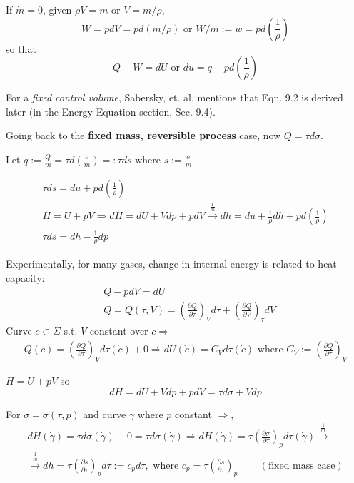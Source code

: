 \documentclass[twoside,landscape,10pt]{amsart}
\theoremstyle{plain}
\theoremstyle{definition}
\theoremstyle{remark}
\theoremstyle{remark}
\begin{document}
\begin{multicols*}{2}
If $\dot{m} = 0$, given $\rho V = m$ or $V = m / \rho$, 
\[
W = pdV = pd(m/\rho ) \text{ or } W / m := w = p d\left( \frac{1}{\rho } \right) 
\]
so that 
\[
Q -W = dU \text{ or } du = q - p d \left(\frac{1}{\rho} \right) 
\]

For a \emph{fixed control volume}, Sabersky, et. al. \cite{SAHG1998} mentions that Eqn. 9.2 is derived later (in the Energy Equation section, Sec. 9.4). 

Going back to the \textbf{fixed mass, reversible process} case, now $Q = \tau d\sigma$. 

Let $q := \frac{Q}{m} = \tau d\left( \frac{\sigma}{m} \right) =: \tau ds$ where $s := \frac{\sigma}{m}$

\begin{equation}
\begin{gathered}
\tau ds = du + p d\left( \frac{1}{\rho} \right) \\
H = U + pV \Longrightarrow dH = dU + Vdp + pdV \xrightarrow{\frac{1}{m}} dh = du + \frac{1}{\rho} dh + pd\left( \frac{1}{\rho} \right) \\
\tau ds = dh - \frac{1}{\rho} dp
\end{gathered}
\end{equation}

Experimentally, for many gases, change in internal energy is related to heat capacity:
\[
\begin{aligned} 
& Q - pdV = dU \\ 
& Q = Q(\tau, V) =  \left( \frac{ \partial Q}{ \partial \tau} \right)_V d\tau + \left( \frac{ \partial Q}{ \partial V} \right)_{\tau} dV 
\end{aligned} 
\]
Curve $c \subset \Sigma$ s.t. $V$ constant over $c \Longrightarrow$ 
\[
\begin{gathered}
Q(\dot{c}) =  \left( \frac{ \partial Q}{ \partial \tau } \right)_V d\tau (\dot{c}) + 0 \Longrightarrow dU(\dot{c}) = C_V d\tau (\dot{c}) \text{ where } C_V := \left( \frac{ \partial Q}{ \partial \tau} \right)_V
\end{gathered}
\]

$H = U + pV$ so 
\[
dH = dU + Vdp + pdV = \tau d\sigma +Vdp
\]

For $\sigma = \sigma(\tau, p)$ and curve $\gamma$ where $p$ constant $\Longrightarrow $,
\[
\begin{gathered}
	dH(\dot{\gamma}) = \tau d\sigma(\dot{\gamma}) + 0 = \tau d\sigma(\dot{\gamma}) \Longrightarrow dH(\dot{\gamma}) = \tau \left( \frac{ \partial \sigma}{ \partial \tau} \right)_p d\tau(\dot{\gamma} ) \xrightarrow{\frac{1}{m} } \\ 
	\xrightarrow{ \frac{1}{m}} dh = \tau \left( \frac{ \partial s }{ \partial \tau} \right)_p d\tau := c_p d\tau, \text{ where } c_p = \tau \left( \frac{ \partial s}{ \partial \tau} \right)_p \qquad \, (\text{fixed mass case}) 
\end{gathered}
\]


\end{multicols*}
\end{document}
